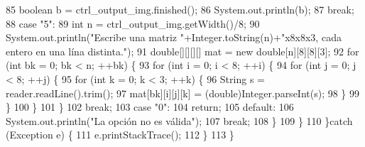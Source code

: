 \begin{DoxyCode}
85                     \textcolor{keywordtype}{boolean} b = ctrl\_output\_img.finished();
86                     System.out.println(b);
87                 \textcolor{keywordflow}{break};
88                 \textcolor{keywordflow}{case} \textcolor{stringliteral}{"5"}:
89                     \textcolor{keywordtype}{int} n = ctrl\_output\_img.getWidth()/8;
90                     System.out.println(\textcolor{stringliteral}{"Escribe una matriz "}+Integer.toString(n)+\textcolor{stringliteral}{"x8x8x3, cada entero en
       una lína distinta."});
91                     \textcolor{keywordtype}{double}[][][][] mat = \textcolor{keyword}{new} \textcolor{keywordtype}{double}[n][8][8][3];
92                     \textcolor{keywordflow}{for} (\textcolor{keywordtype}{int} bk = 0; bk < n; ++bk) \{
93                         \textcolor{keywordflow}{for} (\textcolor{keywordtype}{int} i = 0; i < 8; ++i) \{
94                             \textcolor{keywordflow}{for} (\textcolor{keywordtype}{int} j = 0; j < 8; ++j) \{
95                                 \textcolor{keywordflow}{for} (\textcolor{keywordtype}{int} k = 0; k < 3; ++k) \{
96                                     String s = reader.readLine().trim();
97                                     mat[bk][i][j][k] = (double)Integer.parseInt(s);
98                                 \}
99                             \}
100                         \}
101                     \}
102                 \textcolor{keywordflow}{break};
103                 \textcolor{keywordflow}{case} \textcolor{stringliteral}{"0"}:
104                     \textcolor{keywordflow}{return};
105                 \textcolor{keywordflow}{default}:
106                     System.out.println(\textcolor{stringliteral}{"La opción no es válida"});
107                 \textcolor{keywordflow}{break};
108             \}
109         \}
110     \}\textcolor{keywordflow}{catch} (Exception e) \{
111         e.printStackTrace();
112     \}
113     \}
\end{DoxyCode}
\mbox{\label{classpersistencia_1_1output_1_1Driver____Ctrl__Output__Img_a407a2c1e80b099b7cae5dd0a19683d09}} 
